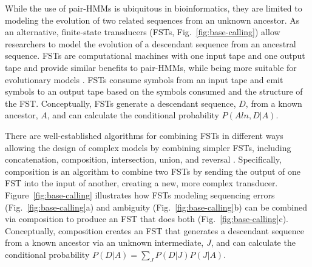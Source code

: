 \documentclass[12pt,letterpaper]{article}
\begin{document}
While the use of pair-HMMs is ubiquitous in bioinformatics, they are limited to modeling the evolution of two related sequences from an unknown ancestor. As an alternative, finite-state transducers (FSTs, Fig.~\ref{fig:base-calling}) allow researchers to model the evolution of a descendant sequence from an ancestral sequence. FSTs are computational machines with one input tape and one output tape and provide similar benefits to pair-HMMs, while being more suitable for evolutionary models \citep{bradley2007transducers}. FSTs consume symbols from an input tape and emit symbols to an output tape based on the symbols consumed and the structure of the FST. Conceptually, FSTs generate a descendant sequence, $D$, from a known ancestor, $A$, and can calculate the conditional probability $P(Aln, D | A)$.

There are well-established algorithms for combining FSTs in different ways allowing the design of complex models by combining simpler FSTs, including concatenation, composition, intersection, union, and reversal \citep{bradley2007transducers,silvestre2021machine}. Specifically, composition is an algorithm to combine two FSTs by sending the output of one FST into the input of another, creating a new, more complex transducer. Figure~\ref{fig:base-calling} illustrates how FSTs modeling sequencing errors (Fig.~\ref{fig:base-calling}a) and ambiguity (Fig.~\ref{fig:base-calling}b) can be combined via composition to produce an FST that does both (Fig.~\ref{fig:base-calling}c). Conceptually, composition creates an FST that generates a descendant sequence from a known ancestor via an unknown intermediate, $J$, and can calculate the conditional probability $P(D|A) = \sum_{J} P(D|J)P(J|A)$. 
\end{document}

